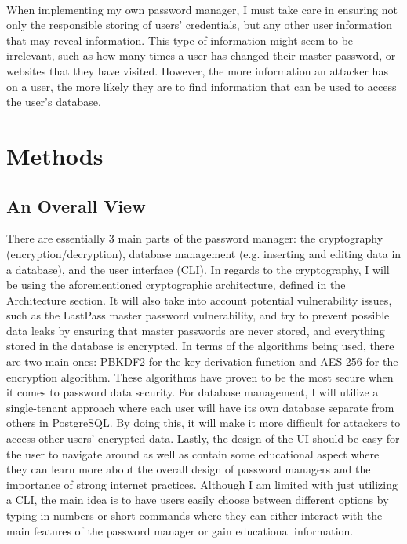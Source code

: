 \documentclass[10pt,twocolumn]{article}
\begin{document}
\paragraph{}
When implementing my own password manager, I must take care in ensuring not only the responsible storing of users' credentials, but any other user information that may reveal information. This type of information might seem to be irrelevant, such as how many times a user has changed their master password, or websites that they have visited. However, the more information an attacker has on a user, the more likely they are to find information that can be used to access the user's database. 

\section{Methods}
\subsection{An Overall View}
There are essentially 3 main parts of the password manager: the cryptography (encryption/decryption), database management (e.g. inserting and editing data in a database), and the user interface (CLI). In regards to the cryptography, I will be using the aforementioned cryptographic architecture, defined in the Architecture section. It will also take into account potential vulnerability issues, such as the LastPass master password vulnerability, and try to prevent possible data leaks by ensuring that master passwords are never stored, and everything stored in the database is encrypted. In terms of the algorithms being used, there are two main ones: PBKDF2 for the key derivation function and AES-256 for the encryption algorithm. These algorithms have proven to be the most secure when it comes to password data security. For database management, I will utilize a single-tenant approach where each user will have its own database separate from others\cite{Gillis_2023} in PostgreSQL. By doing this, it will make it more difficult for attackers to access other users' encrypted data. Lastly, the design of the UI should be easy for the user to navigate around as well as contain some educational aspect where they can learn more about the overall design of password managers and the importance of strong internet practices. Although I am limited with just utilizing a CLI, the main idea is to have users easily choose between different options by typing in numbers or short commands where they can either interact with the main features of the password manager or gain educational information.
\end{document}
